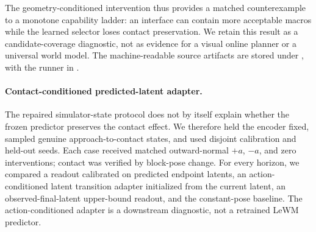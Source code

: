 \documentclass{article}
\begin{document}
\begin{table}[H]
\centering
\scriptsize
\setlength{\tabcolsep}{4pt}
\caption{Equal-budget geometry-conditioned candidate intervention. Deltas are
paired geometry-conditioned minus absolute-fan values on 128 matched held-out
state--goal groups pooled across two fresh seeds. Simulator successors are used
only for offline labels.}
\label{tab:supp-goal-aligned-candidate}
\end{table}

The geometry-conditioned intervention thus provides a matched counterexample
to a monotone capability ladder: an interface can contain more acceptable
macros while the learned selector loses contact preservation. We retain this
result as a candidate-coverage diagnostic, not as evidence for a visual
online planner or a universal world model. The machine-readable source
artifacts are stored under
,
with the runner in
.

\paragraph{Contact-conditioned predicted-latent adapter.}
The repaired simulator-state protocol does not by itself explain whether the
frozen predictor preserves the contact effect. We therefore held the encoder
fixed, sampled genuine approach-to-contact states, and used disjoint
calibration and held-out seeds. Each case received matched outward-normal
$+a$, $-a$, and zero interventions; contact was verified by block-pose change.
For every horizon, we compared a readout calibrated on predicted endpoint
latents, an action-conditioned latent transition adapter initialized from the
current latent, an observed-final-latent upper-bound readout, and the
constant-pose baseline. The action-conditioned adapter is a downstream
diagnostic, not a retrained LeWM predictor.
\end{document}
